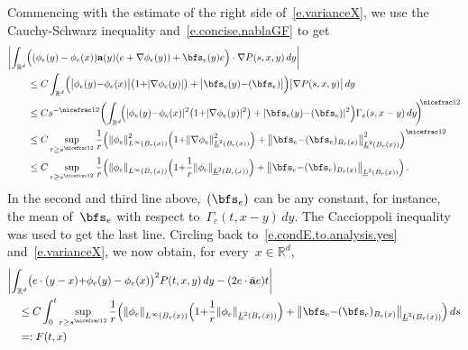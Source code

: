 \documentclass[11pt,twoside]{article} %
\numberwithin{equation}{section}
\theoremstyle{definition}
\let\originalleft\left
\let\originalright\right
\renewcommand{\left}{\mathopen{}\mathclose\bgroup\originalleft}
\renewcommand{\right}{\aftergroup\egroup\originalright}
\newcommand*{\Rd}{\ensuremath{\mathbb{R}^d}}
\renewcommand{\a}{\mathbf{a}}
\newcommand{\ahom}{\bar{\a}}
\begin{document}
Commencing with the estimate of the right side of~\eqref{e.varianceX}, we use the Cauchy-Schwarz inequality and~\eqref{e.concise.nablaGF} to get
\begin{align*}
\lefteqn{ 
\biggl| \int_{\Rd}   
\Bigl( ( \phi_e(y) - \phi_e(x) )
\a(y)(e+\nabla \phi_{e}(y)) 
+ 
\bfs_e (y) e\Bigr)\cdot
\nabla P(s ,x,y)\,dy
\biggr| 
}
\qquad & 
\\ & 
\leq
C\int_{\Rd}   
\Bigl( \bigl|  \phi_e(y)  {-}  \phi_e(x)  \bigr| 
\bigl( 1 {+} |\nabla \phi_{e}(y)| \bigr)  
+ 
\bigl| \bfs_e (y) {-} (\bfs_e) \bigr| \Bigr)
\bigl| \nabla P(s ,x,y) \bigr| \,dy
\\ & 
\leq 
Cs^{-\nicefrac12} 
\biggl( \int_{\Rd} \!  
\Bigl(  |  \phi_e(y) {-} \phi_e(x)   |^2 
\bigl( 1 {+} |\nabla \phi_{e}(y)|^2 \bigr)  
+ 
 | \bfs_e (y) {-} (\bfs_e)  |^2 \Bigr) \Gamma_c (s,x-y)\,dy 
\! \biggr)^{\!\!\nicefrac12} 
\notag \\ & 
\leq
C 
\sup_{r \geq {s}^{\nicefrac12}} 
\frac1{r} 
\Bigl( 
\left\| \phi_e \right\|_{L^\infty(B_{r}(x))}^2
\Bigl( 1 {+} 
\left\| \nabla \phi_e \right\|_{\underline{L}^2(B_{r}(x))}^2
\Bigr) 
+ \left\| \bfs_e {-} (\bfs_e)_{B_r(x)} \right\|_{\underline{L}^2(B_{r}(x))}^2
\Bigr)^{\nicefrac12} 
\notag \\ & 
\leq
C 
\sup_{r \geq {s}^{\nicefrac12}} 
\frac1{r} 
\Bigl( 
\left\| \phi_e \right\|_{L^\infty(B_{r}(x))}
\Bigl( 1 {+} 
\frac1{r} 
\left\| \phi_e \right\|_{\underline{L}^2(B_{r}(x))}
\Bigr) 
+ \left\| \bfs_e {-} (\bfs_e)_{B_r(x)} \right\|_{\underline{L}^2(B_{r}(x))}
\Bigr)
\,.
\end{align*}
In the second and third line above,~$(\bfs_e)$ can be any constant, for instance, the mean of~$\bfs_e$ with respect to~$\Gamma_c(t,x-y)\,dy$. 
The Caccioppoli inequality was used to get the last line.
Circling back to~\eqref{e.condE.to.analysis.yes} and~\eqref{e.varianceX}, we now obtain, for every~$x \in \Rd$,
\begin{align}
\label{e.varianceX.est}
\lefteqn{
\biggl| 
\int_{\Rd} 
\bigl(e \cdot (y-x) {+}\phi_{e}(y) - \phi_e(x) \bigr)^2 P(t,x,y)\,dy 
-
(2 e\cdot \ahom e) t
\biggr| 
} \quad & 
\notag \\ &
\leq
C\int_0^{t}   
\sup_{r \geq {s}^{\nicefrac12}} 
\frac1{r} 
\Bigl( 
\left\| \phi_e \right\|_{L^\infty(B_{r}(x))}
\Bigl( 1 {+} 
\frac1{r} 
\left\| \phi_e \right\|_{\underline{L}^2(B_{r}(x))}
\Bigr) 
+ \left\| \bfs_e {-} (\bfs_e)_{B_r(x)} \right\|_{\underline{L}^2(B_{r}(x))}
\Bigr)
\, ds 
\notag \\ & 
= : F(t,x)
\end{align}
\end{document}
